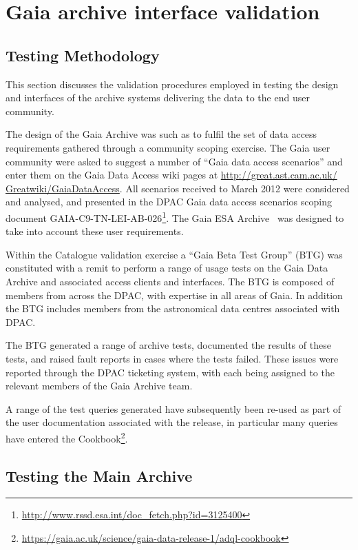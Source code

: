 \section{Gaia archive interface validation}\label{sec:betatest}

\subsection{Testing Methodology}\label{sec:wp910:method}

This section discusses the validation procedures employed in testing the design and interfaces of the archive systems delivering the {}  data to the end user community. 

The design of the Gaia Archive was such as to fulfil the set of data access requirements gathered through a community scoping exercise. The Gaia user community were asked to suggest a number of ``Gaia data access scenarios'' and
enter them on the Gaia Data Access wiki pages at {\small\url{http://great.ast.cam.ac.uk/
Greatwiki/GaiaDataAccess}}. All scenarios received to March 2012 were considered and analysed, and presented in the DPAC Gaia data access scenarios scoping document GAIA-C9-TN-LEI-AB-026\footnote{{\scriptsize\url{http://www.rssd.esa.int/doc_fetch.php?id=3125400}}}. The Gaia ESA Archive~\citep{DPACP-19} was designed to take into account these user requirements. 

Within the Catalogue validation exercise a ``Gaia Beta Test Group'' (BTG) was constituted with a remit to perform a range of usage tests on the Gaia Data Archive and associated access clients and interfaces. The BTG is composed of members from across the DPAC, with expertise in all areas of Gaia. In addition the BTG includes members from the astronomical data centres associated with DPAC. 

The BTG generated a range of archive tests, documented the results of these tests, and raised fault reports in cases where the tests failed. These issues were reported through the DPAC ticketing system, with each being assigned to the relevant members of the Gaia Archive team. 

A range of the test queries generated have subsequently been re-used as part of the user documentation associated with the {} release, in particular many queries have entered the  {} Cookbook\footnote{{\scriptsize\url{https://gaia.ac.uk/science/gaia-data-release-1/adql-cookbook}}}. 

\subsection{Testing the Main {}  Archive}\label{sec:wp910:main}

